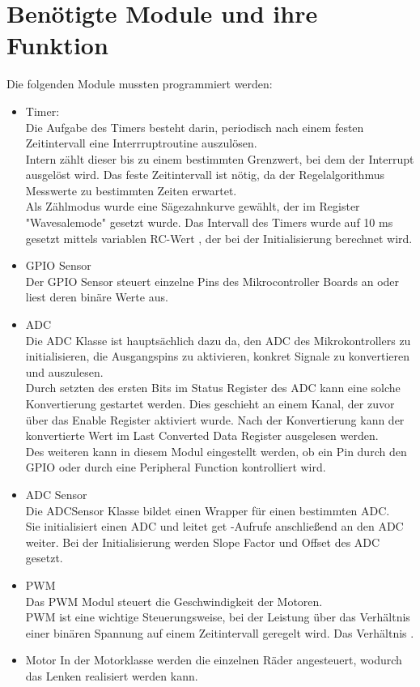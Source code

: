 \documentclass[a4paper,10pt,twoside]{report}
\begin{document}
\section{Benötigte Module und ihre Funktion}
Die folgenden Module mussten programmiert werden:
\begin{itemize}
\item Timer:\\
Die Aufgabe des Timers besteht darin, periodisch nach einem festen Zeitintervall eine Interrruptroutine auszulösen.\\ Intern zählt dieser bis zu einem bestimmten Grenzwert, bei dem der Interrupt ausgelöst wird. Das feste Zeitintervall ist nötig, da der Regelalgorithmus Messwerte zu bestimmten Zeiten erwartet.\\
Als Zählmodus wurde eine Sägezahnkurve gewählt, der im Register "Wavesalemode" gesetzt wurde. Das Intervall des Timers wurde auf 10 ms gesetzt mittels variablen RC-Wert , der bei der Initialisierung berechnet wird.
\item GPIO Sensor\\
Der GPIO Sensor steuert einzelne Pins des Mikrocontroller Boards an oder liest deren binäre Werte aus.
\item ADC\\
Die ADC Klasse ist hauptsächlich dazu da, den ADC des Mikrokontrollers zu initialisieren, die Ausgangspins
zu aktivieren, konkret Signale zu konvertieren und auszulesen.\\
Durch setzten des ersten Bits im Status Register des ADC kann eine solche Konvertierung gestartet werden. 
Dies geschieht an einem Kanal, der zuvor über das Enable Register aktiviert wurde. 
Nach der Konvertierung kann der konvertierte Wert im Last Converted Data Register ausgelesen werden.\\
Des weiteren kann in diesem Modul eingestellt werden, ob ein Pin durch den GPIO oder durch
eine Peripheral Function kontrolliert wird.
\item ADC Sensor\\
Die ADCSensor Klasse bildet einen Wrapper für einen bestimmten ADC.\\
Sie initialisiert einen ADC und leitet get -Aufrufe anschließend an den ADC weiter. Bei der Initialisierung werden Slope Factor und Offset des ADC gesetzt.\\
\item PWM\\
Das PWM Modul steuert die Geschwindigkeit der Motoren.\\
PWM ist eine wichtige Steuerungsweise, bei der Leistung über das Verhältnis einer binären Spannung auf einem Zeitintervall geregelt wird.
Das Verhältnis .
\item Motor
In der Motorklasse werden die einzelnen Räder angesteuert, wodurch das Lenken realisiert werden kann. 

\end{itemize}
\end{document}
